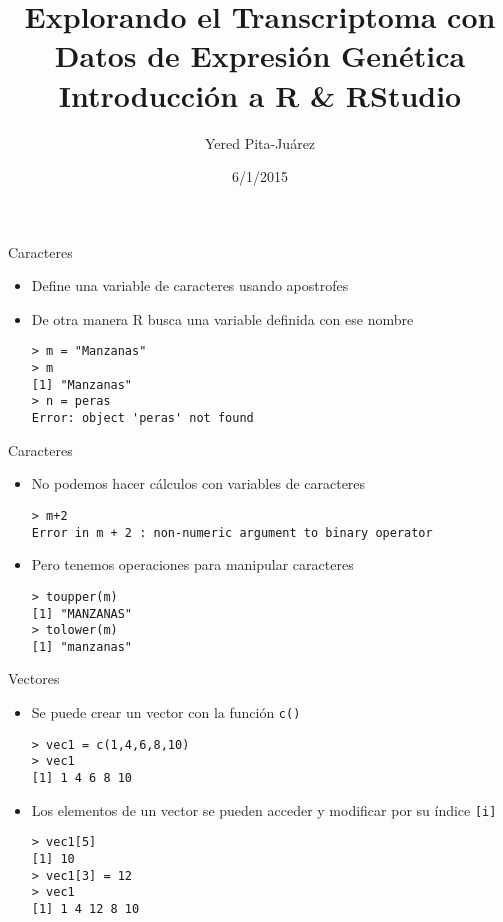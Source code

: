 \documentclass{beamer}
\begin{document}
\title[Introducción a R \& RStudio]{Explorando el Transcriptoma con Datos de Expresi\'{o}n Gen\'{e}tica\\
\vspace{0.5cm}
Introducción a R \& RStudio}
\author{Yered Pita-Ju\'{a}rez}
\date{6/1/2015}


\begin{frame}
\titlepage
\end{frame}

\begin{frame}[fragile]{Caracteres}
\begin{itemize}
\item Define una variable de caracteres usando apostrofes
\item De otra manera R busca una variable definida con ese nombre
\begin{verbatim}
> m = "Manzanas"
> m
[1] "Manzanas"
> n = peras
Error: object 'peras' not found
\end{verbatim}
\end{itemize}
\end{frame}

\begin{frame}[fragile]{Caracteres}
\begin{itemize}
\item No podemos hacer cálculos con variables de caracteres
\begin{verbatim}
> m+2
Error in m + 2 : non-numeric argument to binary operator
\end{verbatim}
\item Pero tenemos operaciones para manipular caracteres
\begin{verbatim}
> toupper(m)
[1] "MANZANAS"
> tolower(m)
[1] "manzanas"
\end{verbatim}
\end{itemize}
\end{frame}


\begin{frame}[fragile]{Vectores}
\begin{itemize}
\item Se puede crear un vector con la función \verb=c()=
\begin{verbatim}
> vec1 = c(1,4,6,8,10)
> vec1
[1] 1 4 6 8 10
\end{verbatim}
\item Los elementos de un vector se pueden acceder y modificar por su índice \verb=[i]=
\begin{verbatim}
> vec1[5]
[1] 10
> vec1[3] = 12
> vec1
[1] 1 4 12 8 10
\end{verbatim}
\end{itemize}
\end{frame}
\end{document}
